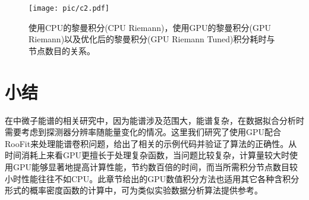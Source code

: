 \begin{figure}
    \centering
    \texttt{[image: pic/c2.pdf]}
    \caption{ 使用CPU的黎曼积分(CPU Riemann)，使用GPU的黎曼积分(GPU Riemann)以及优化后的黎曼积分(GPU Riemann Tuned)积分耗时与节点数目的关系。}
    \label{fig:cuda_3}
\end{figure}

\section{小结}

在中微子能谱的相关研究中，因为能谱涉及范围大，能谱复杂，在数据拟合分析时需要考虑到探测器分辨率随能量变化的情况。这里我们研究了使用GPU配合RooFit来处理能谱卷积问题，给出了相关的示例代码并验证了算法的正确性。从时间消耗上来看GPU更擅长于处理复杂函数，当问题比较复杂，计算量较大时使用GPU能够显著地提高计算性能，节约数百倍的时间，而当所需积分节点数目较小时性能往往不如CPU。此章节给出的GPU数值积分方法也适用其它各种含积分形式的概率密度函数的计算中，可为类似实验数据分析算法提供参考。